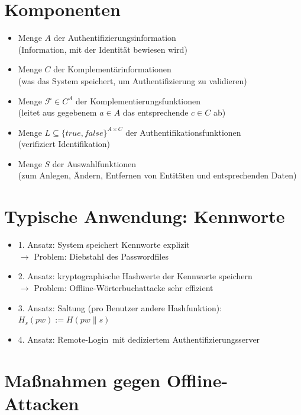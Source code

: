 \documentclass[a4paper,twoside,DIV15,BCOR12mm]{scrbook}
\begin{document}
\section{Komponenten}

\begin{itemize}
	\item Menge $A$ der Authentifizierungsinformation\\ (Information, mit der Identität bewiesen wird)
	\item Menge $C$ der Komplementärinformationen\\ (was das System speichert, um Authentifizierung zu validieren)
	\item Menge $\mathcal{F} \in C^A$ der Komplementierungsfunktionen\\ (leitet aus gegebenem $a \in A$ das entsprechende $c \in C$ ab)
	\item Menge $L \subseteq {\{ true, false \}}^{A \times C}$ der Authentifikationsfunktionen\\ (verifiziert Identifikation)
	\item Menge $S$ der Auswahlfunktionen\\ (zum Anlegen, Ändern, Entfernen von Entitäten und entsprechenden Daten)
\end{itemize}

\section{Typische Anwendung: Kennworte}

\begin{itemize}
	\item 1. Ansatz: System speichert Kennworte explizit\\ $\rightarrow$ Problem: Diebstahl des Passwordfiles
	\item 2. Ansatz: kryptographische Hashwerte der Kennworte speichern\\ $\rightarrow$ Problem: Offline-Wörterbuchattacke sehr effizient
	\item 3. Ansatz: Saltung (pro Benutzer andere Hashfunktion): $H_s(pw) := H(pw \| s)$
	\item 4. Ansatz: \glqq Remote-Login\grqq\ mit dediziertem Authentifizierungsserver
\end{itemize}

\section{Maßnahmen gegen Offline-Attacken}
\end{document}
